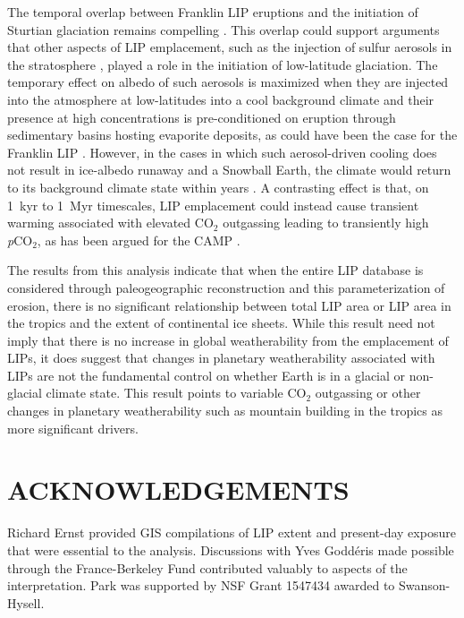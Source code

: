 \documentclass[11pt,letterpaper]{article}
\begin{document}
The temporal overlap between Franklin LIP eruptions and the initiation of Sturtian glaciation remains compelling \citep{Macdonald2010a, MacLennan2018a}. This overlap could support arguments that other aspects of LIP emplacement, such as the injection of sulfur aerosols in the stratosphere \citep{Macdonald2017a}, played a role in the initiation of low-latitude glaciation. The temporary effect on albedo of such aerosols is maximized when they are injected into the atmosphere at low-latitudes into a cool background climate and their presence at high concentrations is pre-conditioned on eruption through sedimentary basins hosting evaporite deposits, as could have been the case for the Franklin LIP \citep{Macdonald2017a}. However, in the cases in which such aerosol-driven cooling does not result in ice-albedo runaway and a Snowball Earth, the climate would return to its background climate state within years \citep{Macdonald2017a}. A contrasting effect is that, on 1~kyr to 1~Myr timescales, LIP emplacement could instead cause transient warming associated with elevated CO$_{2}$ outgassing leading to transiently high \textit{p}CO$_{2}$, as has been argued for the CAMP \citep{Schaller2011a, Schaller2012a}.

The results from this analysis indicate that when the entire LIP database is considered through paleogeographic reconstruction and this parameterization of erosion, there is no significant relationship between total LIP area or LIP area in the tropics and the extent of continental ice sheets. While this result need not imply that there is no increase in global weatherability from the emplacement of LIPs, it does suggest that changes in planetary weatherability associated with LIPs are not the fundamental control on whether Earth is in a glacial or non-glacial climate state. This result points to variable CO$_{2}$ outgassing or other changes in planetary weatherability such as mountain building in the tropics as more significant drivers.

\section*{ACKNOWLEDGEMENTS \label{sec:ACKNOWLEDGEMENTS}}

Richard Ernst provided GIS compilations of LIP extent and present-day exposure that were essential to the analysis. Discussions with Yves Godd\'eris made possible through the France-Berkeley Fund contributed valuably to aspects of the interpretation. Park was supported by NSF Grant 1547434 awarded to Swanson-Hysell.
\end{document}
